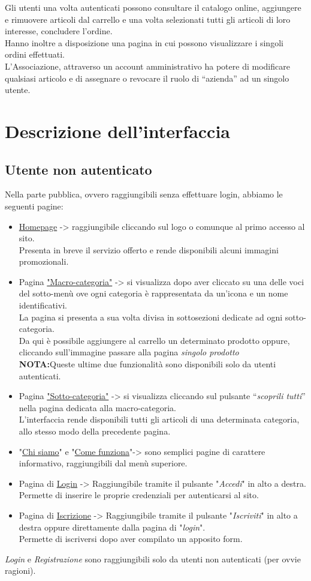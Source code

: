 Gli utenti una volta autenticati possono consultare il catalogo online, aggiungere e rimuovere articoli dal carrello e una volta selezionati tutti gli articoli di loro interesse, concludere l’ordine. \\
Hanno inoltre a disposizione una pagina in cui possono visualizzare i singoli ordini effettuati.\\

L’Associazione, attraverso un account amministrativo ha potere di modificare qualsiasi articolo e di assegnare o revocare il ruolo di “azienda” ad un singolo utente. 
\newpage
\section{Descrizione dell'interfaccia}
\subsection{Utente non autenticato}
Nella parte pubblica, ovvero raggiungibili senza effettuare login, abbiamo le seguenti pagine:
\begin{itemize}
	\item \underline{Homepage} -> raggiungibile cliccando sul logo o comunque al primo accesso al sito.\\ Presenta in breve il servizio offerto e rende disponibili alcuni immagini promozionali.
	\item Pagina \underline{"Macro-categoria"} -> si visualizza dopo aver cliccato su una delle voci del sotto-menù ove ogni categoria è rappresentata da un’icona e un nome identificativi.\\ La pagina si presenta a sua volta divisa in sottosezioni dedicate ad ogni sotto-categoria.\\
	Da qui è possibile aggiungere al carrello un determinato prodotto oppure, cliccando sull'immagine passare alla pagina \textit{singolo prodotto}\\ \textbf{NOTA:}Queste ultime due funzionalità sono disponibili solo da utenti autenticati.
	\item Pagina \underline{"Sotto-categoria"} -> si visualizza cliccando sul pulsante “\textit{scoprili tutti}” nella pagina dedicata alla macro-categoria.\\L’interfaccia rende disponibili tutti gli articoli di una determinata categoria, allo stesso modo della precedente pagina.
	\item "\underline{Chi siamo}"  e "\underline{Come funziona}"-> sono semplici pagine di carattere informativo, raggiungibili dal menù superiore.
	\item Pagina di \underline{Login} -> Raggiungibile tramite il pulsante "\textit{Accedi}" in alto a destra.\\
	Permette di inserire le proprie credenziali per autenticarsi al sito.
	\item Pagina di \underline{Iscrizione} -> Raggiungibile tramite il pulsante "\textit{Iscriviti}" in alto a destra oppure direttamente dalla pagina di "\textit{login}".\\
	Permette di iscriversi dopo aver compilato un apposito form.
\end{itemize}
\textit{Login} e \textit{Registrazione} sono raggiungibili solo da utenti non autenticati (per ovvie ragioni).
